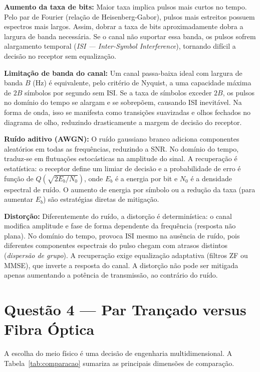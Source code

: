 \documentclass[conference]{IEEEtran}
\begin{document}
\textbf{Aumento da taxa de bits:} Maior taxa implica pulsos mais curtos no tempo. Pelo par
de Fourier (relação de Heisenberg-Gabor), pulsos mais estreitos possuem espectros mais largos.
Assim, dobrar a taxa de bits aproximadamente dobra a largura de banda necessária. Se o canal
não suportar essa banda, os pulsos sofrem alargamento temporal (\textit{ISI --- Inter-Symbol
Interference}), tornando difícil a decisão no receptor sem equalização.

\textbf{Limitação de banda do canal:} Um canal passa-baixa ideal com largura de banda $B$
(Hz) é equivalente, pelo critério de Nyquist, a uma capacidade máxima de $2B$ símbolos por
segundo sem ISI. Se a taxa de símbolos exceder $2B$, os pulsos no domínio do tempo se
alargam e se sobrepõem, causando ISI inevitável. Na forma de onda, isso se manifesta como
transições suavizadas e olhos fechados no diagrama de olho, reduzindo drasticamente a margem
de decisão do receptor.

\textbf{Ruído aditivo (AWGN):} O ruído gaussiano branco adiciona componentes aleatórios em
todas as frequências, reduzindo a SNR. No domínio do tempo, traduz-se em flutuações
estocásticas na amplitude do sinal. A recuperação é estatística: o receptor define um limiar
de decisão e a probabilidade de erro é função de $Q(\sqrt{2E_b/N_0})$, onde $E_b$ é a
energia por bit e $N_0$ é a densidade espectral de ruído. O aumento de energia por símbolo
ou a redução da taxa (para aumentar $E_b$) são estratégias diretas de mitigação.

\textbf{Distorção:} Diferentemente do ruído, a distorção é determinística: o canal modifica
amplitude e fase de forma dependente da frequência (resposta não plana). No domínio do tempo,
provoca ISI mesmo na ausência de ruído, pois diferentes componentes espectrais do pulso
chegam com atrasos distintos (\textit{dispersão de grupo}). A recuperação exige equalização
adaptativa (filtros ZF ou MMSE), que inverte a resposta do canal. A distorção não pode ser
mitigada apenas aumentando a potência de transmissão, ao contrário do ruído.

\section*{Questão 4 — Par Trançado versus Fibra Óptica}

A escolha do meio físico é uma decisão de engenharia multidimensional. A
Tabela~\ref{tab:comparacao} sumariza as principais dimensões de comparação.
\end{document}
